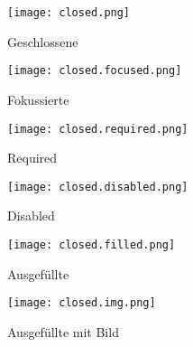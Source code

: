 
\begin{figure}[!htb]
    \centering
    \begin{minipage}[b]{0.45\textwidth}
        \centering
        \texttt{[image: closed.png]}
        \caption{\centering Geschlossene }
        \label{img:closedNewComp}
    \end{minipage}
    \hfill
    \begin{minipage}[b]{0.45\textwidth}
        \centering
        \texttt{[image: closed.focused.png]}
        \caption{\centering Fokussierte }
        \label{img:closedFocusedNewComp}
    \end{minipage}
\end{figure}

\begin{figure}[!htb]
    \centering
    \begin{minipage}[b]{0.45\textwidth}
        \centering
        \texttt{[image: closed.required.png]}
        \caption{\centering Required }
        \label{img:closedRequiredNewComp}
    \end{minipage}
    \hfill
    \begin{minipage}[b]{0.45\textwidth}
        \centering
        \texttt{[image: closed.disabled.png]}
        \caption{\centering Disabled }
        \label{img:closedDisabledNewComp}
    \end{minipage}
\end{figure}

\begin{figure}[!htb]
    \centering
    \begin{minipage}[b]{0.45\textwidth}
        \centering
        \texttt{[image: closed.filled.png]}
        \caption{\centering Ausgefüllte }
        \label{img:closedFilledNewComp}
    \end{minipage}
    \hfill
    \begin{minipage}[b]{0.45\textwidth}
        \centering
        \texttt{[image: closed.img.png]}
        \caption{\centering Ausgefüllte  mit Bild}
        \label{img:closedImgNewComp}
    \end{minipage}
\end{figure}


